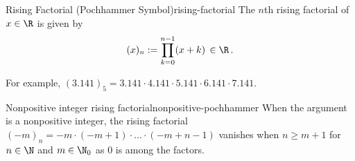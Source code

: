 \begin{definition}{Rising Factorial (Pochhammer Symbol)}{rising-factorial}
  The $n$th rising factorial of $x \in \R$ is given by
  $$(x)_n := \prod_{k=0}^{n-1} (x+k) \,\in \R\,.$$
\end{definition}

For example, $(3.141)_5 = 3.141 \cdot 4.141 \cdot 5.141 \cdot 6.141 \cdot 7.141$.

\begin{remark}{Nonpositive integer rising factorial}{nonpositive-pochhammer}
  When the argument is a nonpositive integer, the rising factorial
  $(-m)_n = -m \cdot (-m+1) \cdot ... \cdot (-m+n-1)$
  vanishes when $n \ge m+1$ for $n \in \N$ and $m \in \N_0$ as $0$ is among the factors.
\end{remark}
